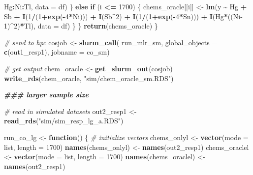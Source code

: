 \documentclass[12pt, twoside]{amherstthesis}
\newenvironment{Shaded}{\begin{snugshade}}{\end{snugshade}}
\newcommand{\AttributeTok}[1]{\textcolor[rgb]{0.13,0.29,0.53}{#1}}
\newcommand{\CommentTok}[1]{\textcolor[rgb]{0.56,0.35,0.01}{\textit{#1}}}
\newcommand{\ControlFlowTok}[1]{\textcolor[rgb]{0.13,0.29,0.53}{\textbf{#1}}}
\newcommand{\DecValTok}[1]{\textcolor[rgb]{0.00,0.00,0.81}{#1}}
\newcommand{\DocumentationTok}[1]{\textcolor[rgb]{0.56,0.35,0.01}{\textbf{\textit{#1}}}}
\newcommand{\FunctionTok}[1]{\textcolor[rgb]{0.13,0.29,0.53}{\textbf{#1}}}
\newcommand{\NormalTok}[1]{#1}
\newcommand{\OtherTok}[1]{\textcolor[rgb]{0.56,0.35,0.01}{#1}}
\newcommand{\SpecialCharTok}[1]{\textcolor[rgb]{0.81,0.36,0.00}{\textbf{#1}}}
\newcommand{\StringTok}[1]{\textcolor[rgb]{0.31,0.60,0.02}{#1}}
\begin{document}
\begin{Shaded}
\begin{Highlighting}[]
\NormalTok{                                Hg}\SpecialCharTok{:}\NormalTok{Ni}\SpecialCharTok{:}\NormalTok{Tl, }\AttributeTok{data =}\NormalTok{ df)}
\NormalTok{    \} }\ControlFlowTok{else} \ControlFlowTok{if}\NormalTok{ (i }\SpecialCharTok{\textless{}=} \DecValTok{1700}\NormalTok{) \{}
\NormalTok{      chems\_oracle[[i]] }\OtherTok{\textless{}{-}} \FunctionTok{lm}\NormalTok{(y }\SpecialCharTok{\textasciitilde{}}\NormalTok{ Hg }\SpecialCharTok{+}\NormalTok{ Sb }\SpecialCharTok{+}
                                \FunctionTok{I}\NormalTok{(}\DecValTok{1}\SpecialCharTok{/}\NormalTok{(}\DecValTok{1}\SpecialCharTok{+}\FunctionTok{exp}\NormalTok{(}\SpecialCharTok{{-}}\DecValTok{4}\SpecialCharTok{*}\NormalTok{Ni))) }\SpecialCharTok{+} \FunctionTok{I}\NormalTok{(Sb}\SpecialCharTok{\^{}}\DecValTok{2}\NormalTok{) }\SpecialCharTok{+} \FunctionTok{I}\NormalTok{(}\DecValTok{1}\SpecialCharTok{/}\NormalTok{(}\DecValTok{1}\SpecialCharTok{+}\FunctionTok{exp}\NormalTok{(}\SpecialCharTok{{-}}\DecValTok{4}\SpecialCharTok{*}\NormalTok{Sn))) }\SpecialCharTok{+}
                                \FunctionTok{I}\NormalTok{(Hg}\SpecialCharTok{*}\NormalTok{((Ni}\DecValTok{{-}1}\NormalTok{)}\SpecialCharTok{\^{}}\DecValTok{2}\NormalTok{)}\SpecialCharTok{*}\NormalTok{Tl), }\AttributeTok{data =}\NormalTok{ df)}
\NormalTok{    \}}
\NormalTok{  \}}
  \FunctionTok{return}\NormalTok{(chems\_oracle)}
\NormalTok{\}}

\CommentTok{\# send to hpc}
\NormalTok{cosjob }\OtherTok{\textless{}{-}} \FunctionTok{slurm\_call}\NormalTok{(}
\NormalTok{  run\_mlr\_sm, }
  \AttributeTok{global\_objects =} \FunctionTok{c}\NormalTok{(}\StringTok{\textquotesingle{}out1\_resp1\textquotesingle{}}\NormalTok{),}
  \AttributeTok{jobname =} \StringTok{\textquotesingle{}co\_sm\textquotesingle{}}\NormalTok{)}

\CommentTok{\# get output}
\NormalTok{chem\_oracle }\OtherTok{\textless{}{-}} \FunctionTok{get\_slurm\_out}\NormalTok{(cosjob)}
\FunctionTok{write\_rds}\NormalTok{(chem\_oracle, }\StringTok{"sim/chem\_oracle\_sm.RDS"}\NormalTok{)}

\DocumentationTok{\#\#\# larger sample size}

\CommentTok{\# read in simulated datasets}
\NormalTok{out2\_resp1 }\OtherTok{\textless{}{-}} \FunctionTok{read\_rds}\NormalTok{(}\StringTok{"sim/sim\_resp\_lg\_a.RDS"}\NormalTok{)}

\NormalTok{run\_co\_lg }\OtherTok{\textless{}{-}} \ControlFlowTok{function}\NormalTok{() \{}
  \CommentTok{\# initialize vectors}
\NormalTok{  chems\_onlyl }\OtherTok{\textless{}{-}} \FunctionTok{vector}\NormalTok{(}\AttributeTok{mode =} \StringTok{\textquotesingle{}list\textquotesingle{}}\NormalTok{, }\AttributeTok{length =} \DecValTok{1700}\NormalTok{)}
  \FunctionTok{names}\NormalTok{(chems\_onlyl) }\OtherTok{\textless{}{-}} \FunctionTok{names}\NormalTok{(out2\_resp1)}
\NormalTok{  chems\_oraclel }\OtherTok{\textless{}{-}} \FunctionTok{vector}\NormalTok{(}\AttributeTok{mode =} \StringTok{\textquotesingle{}list\textquotesingle{}}\NormalTok{, }\AttributeTok{length =} \DecValTok{1700}\NormalTok{) }
  \FunctionTok{names}\NormalTok{(chems\_oraclel) }\OtherTok{\textless{}{-}} \FunctionTok{names}\NormalTok{(out2\_resp1)}
  

\end{Highlighting}
\end{Shaded}
\end{document}
